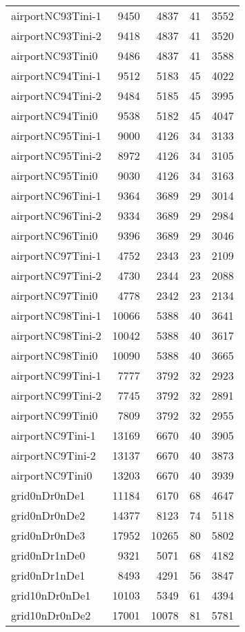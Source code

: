 \begin{longtable}{lrrrr}
airportNC93Tini-1 & 9450 & 4837 & 41 & 3552 \\
airportNC93Tini-2 & 9418 & 4837 & 41 & 3520 \\
airportNC93Tini0 & 9486 & 4837 & 41 & 3588 \\
airportNC94Tini-1 & 9512 & 5183 & 45 & 4022 \\
airportNC94Tini-2 & 9484 & 5185 & 45 & 3995 \\
airportNC94Tini0 & 9538 & 5182 & 45 & 4047 \\
airportNC95Tini-1 & 9000 & 4126 & 34 & 3133 \\
airportNC95Tini-2 & 8972 & 4126 & 34 & 3105 \\
airportNC95Tini0 & 9030 & 4126 & 34 & 3163 \\
airportNC96Tini-1 & 9364 & 3689 & 29 & 3014 \\
airportNC96Tini-2 & 9334 & 3689 & 29 & 2984 \\
airportNC96Tini0 & 9396 & 3689 & 29 & 3046 \\
airportNC97Tini-1 & 4752 & 2343 & 23 & 2109 \\
airportNC97Tini-2 & 4730 & 2344 & 23 & 2088 \\
airportNC97Tini0 & 4778 & 2342 & 23 & 2134 \\
airportNC98Tini-1 & 10066 & 5388 & 40 & 3641 \\
airportNC98Tini-2 & 10042 & 5388 & 40 & 3617 \\
airportNC98Tini0 & 10090 & 5388 & 40 & 3665 \\
airportNC99Tini-1 & 7777 & 3792 & 32 & 2923 \\
airportNC99Tini-2 & 7745 & 3792 & 32 & 2891 \\
airportNC99Tini0 & 7809 & 3792 & 32 & 2955 \\
airportNC9Tini-1 & 13169 & 6670 & 40 & 3905 \\
airportNC9Tini-2 & 13137 & 6670 & 40 & 3873 \\
airportNC9Tini0 & 13203 & 6670 & 40 & 3939 \\
grid0nDr0nDe1 & 11184 & 6170 & 68 & 4647 \\
grid0nDr0nDe2 & 14377 & 8123 & 74 & 5118 \\
grid0nDr0nDe3 & 17952 & 10265 & 80 & 5802 \\
grid0nDr1nDe0 & 9321 & 5071 & 68 & 4182 \\
grid0nDr1nDe1 & 8493 & 4291 & 56 & 3847 \\
grid10nDr0nDe1 & 10103 & 5349 & 61 & 4394 \\
grid10nDr0nDe2 & 17001 & 10078 & 81 & 5781 \\

\end{longtable}
